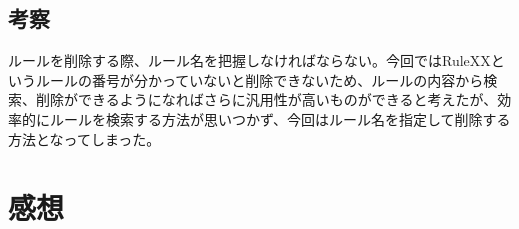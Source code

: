 \documentclass[a4j]{jarticle}
\begin{document}
\subsection{考察}
ルールを削除する際、ルール名を把握しなければならない。今回ではRuleXXというルールの番号が分かっていないと削除できないため、ルールの内容から検索、削除ができるようになればさらに汎用性が高いものができると考えたが、効率的にルールを検索する方法が思いつかず、今回はルール名を指定して削除する方法となってしまった。
\section{感想}
\end{document}
